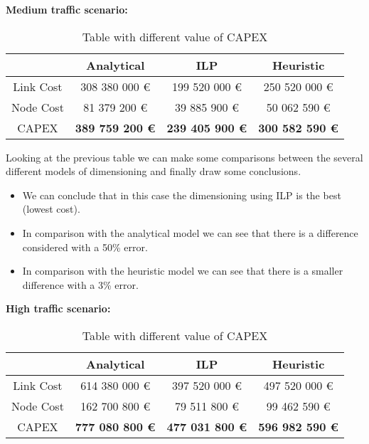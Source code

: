 \vspace{11pt}
\textbf{Medium traffic scenario:}

\begin{table}[h!]
\centering
\begin{tabular}{| c | c | c | c |}
 \hline
   & Analytical & ILP & Heuristic \\
 \hline\hline
 Link Cost & 308 380 000 \euro & 199 520 000 \euro & 250 520 000 \euro \\
 Node Cost & 81 379 200 \euro & 39 885 900 \euro & 50 062 590 \euro \\
 CAPEX & \textbf{389 759 200 \euro} & \textbf{239 405 900 \euro} & \textbf{300 582 590 \euro} \\
 \hline
\end{tabular}
\caption{Table with different value of CAPEX }
\label{table_comparative_opaque_protec_ref_2}
\end{table}

\vspace{11pt}
Looking at the previous table we can make some comparisons between the several different models of dimensioning and finally draw some conclusions.

\begin{itemize}
  \item We can conclude that in this case the dimensioning using ILP is the best (lowest cost).
  \item In comparison with the analytical model we can see that there is a difference considered with a 50\% error.
  \item In comparison with the heuristic model we can see that there is a smaller difference with a 3\% error.
\end{itemize}


\vspace{11pt}
\textbf{High traffic scenario:}\\

\begin{table}[h!]
\centering
\begin{tabular}{| c | c | c | c |}
 \hline
   & Analytical & ILP & Heuristic \\
 \hline\hline
 Link Cost & 614 380 000 \euro & 397 520 000 \euro & 497 520 000 \euro \\
 Node Cost & 162 700 800 \euro & 79 511 800 \euro & 99 462 590 \euro \\
 CAPEX & \textbf{777 080 800 \euro} & \textbf{477 031 800 \euro} & \textbf{596 982 590 \euro} \\
 \hline
\end{tabular}
\caption{Table with different value of CAPEX }
\label{table_comparative_opaque_protec_ref_3}
\end{table}

